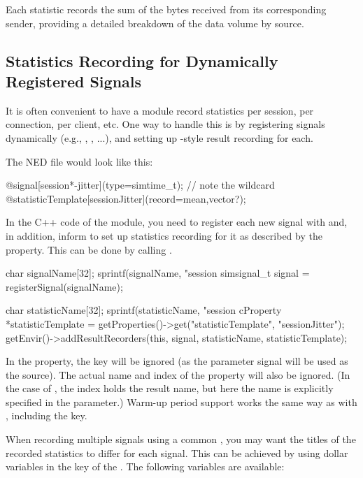 Each statistic records the sum of the bytes received from its corresponding sender,
providing a detailed breakdown of the data volume by source.


\subsection{Statistics Recording for Dynamically Registered Signals}
\label{sec:simple-modules:statistic-recording-dynamic-signals}

It is often convenient to have a module record statistics per session, per
connection, per client, etc. One way to handle this is by registering
signals dynamically (e.g., , , ...),
and setting up -style result recording for each.

The NED file would look like this:

\begin{ned}
@signal[session*-jitter](type=simtime_t); // note the wildcard
@statisticTemplate[sessionJitter](record=mean,vector?);
\end{ned}

In the C++ code of the module, you need to register each new signal with
 and, in addition, inform {\opp} to set up statistics
recording for it as described by the  property.
This can be done by calling .

\begin{cpp}
char signalName[32];
sprintf(signalName, "session%
simsignal_t signal = registerSignal(signalName);

char statisticName[32];
sprintf(statisticName, "session%
cProperty *statisticTemplate =
    getProperties()->get("statisticTemplate", "sessionJitter");
getEnvir()->addResultRecorders(this, signal, statisticName, statisticTemplate);
\end{cpp}

In the  property, the  key will be
ignored (as the parameter signal will be used as the source). The actual
name and index of the property will also be ignored. (In the case of ,
the index holds the result name, but here the name is explicitly specified
in the  parameter.) Warm-up period support works
the same way as with , including the 
key.

When recording multiple signals using a common ,
you may want the titles of the recorded statistics to differ for each signal.
This can be achieved by using dollar variables in the  key of the
. The following variables are available:


